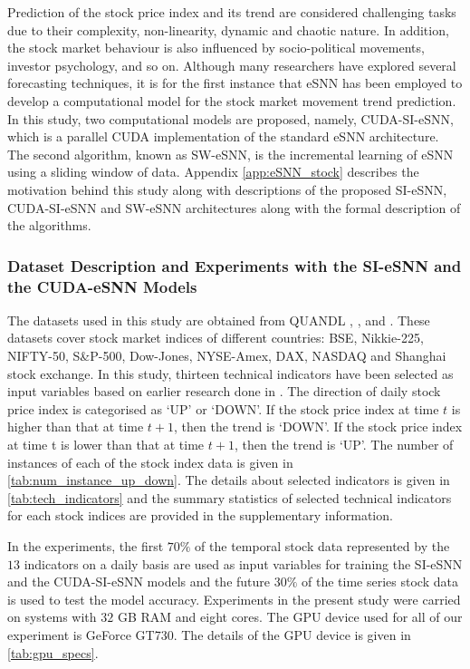 Prediction of the stock price index and its trend are considered challenging tasks due to their complexity, non-linearity, dynamic and chaotic nature. In addition, the stock market behaviour is also influenced by socio-political movements, investor psychology, and so on. Although many researchers have explored several forecasting techniques, it is for the first instance that eSNN has been employed to develop a computational model for the stock market movement trend prediction. In this study, two computational models are proposed, namely, CUDA-SI-eSNN, which is a parallel CUDA implementation of the standard eSNN architecture. The second algorithm, known as SW-eSNN, is the incremental learning of eSNN using a sliding window of data. Appendix \ref{app:eSNN_stock} describes the motivation behind this study along with descriptions of the proposed SI-eSNN, CUDA-SI-eSNN and SW-eSNN architectures along with the formal description of the algorithms. 

\subsubsection{Dataset Description and Experiments with the SI-eSNN and the CUDA-eSNN Models}
\label{sec:dataset}

The datasets used in this study are obtained from QUANDL \citep{Quandl2017financial}, \citep{Bse2017financial}, and \citep{Nse2017financial}. These datasets cover stock market indices of different countries: BSE, Nikkie-225, NIFTY-50, S\&P-500, Dow-Jones, NYSE-Amex, DAX, NASDAQ and Shanghai stock exchange. In this study, thirteen technical indicators have been selected as input variables based on earlier research done in \citep{kim2003financial,patel2015predicting,kara2011predicting}. The direction of daily stock price index is categorised as `UP' or `DOWN'. If the stock price index at time $t$ is higher than that at time $t+1$, then the trend is `DOWN'. If the stock price index at time t is lower than that at time $t+1$, then the trend is `UP'. The number of instances of each of the stock index data is given in \tablename \ref{tab:num_instance_up_down}. The details about selected indicators is given in \tablename \ref{tab:tech_indicators} and the summary statistics of selected technical indicators for each stock indices are provided in the supplementary information.

In the experiments, the first $70\%$ of the temporal stock data represented by the $13$ indicators on a daily basis are used as input variables for training the SI-eSNN and the CUDA-SI-eSNN models and the future $30\%$ of the time series stock data is used to test the model accuracy. Experiments in the present study were carried on systems with $32$ GB RAM and eight cores. The GPU device used for all of our experiment is GeForce GT730.  The details of the GPU device is given in \tablename \ref{tab:gpu_specs}. 

